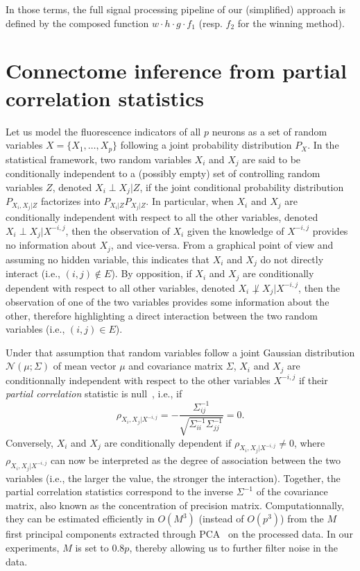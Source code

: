 \documentclass[wcp]{jmlr}
\begin{document}
In those terms, the full signal processing pipeline of our (simplified)
approach is defined by the composed function $w \cdot h \cdot g \cdot f_1$
(resp. $f_2$ for the winning method).


\section{Connectome inference from partial correlation statistics}
\label{sec:inference}

Let us model the fluorescence indicators of all $p$ neurons as a set of random
variables $X = \{X_1, \dots, X_p\}$ following a joint probability distribution
$P_X$. In the statistical framework, two random variables $X_i$ and $X_j$ are
said to be conditionally independent to a (possibly empty) set of controlling
random variables $Z$, denoted $X_i \perp X_j | Z$, if the joint conditional
probability distribution $P_{X_i, X_j | Z}$ factorizes into $P_{X_i|Z}
P_{X_j|Z}$. In particular, when $X_i$ and $X_j$ are conditionally independent
with respect to all the other variables, denoted $X_i \perp X_j | X^{-i,j}$, then the
observation of $X_i$ given the knowledge of $X^{-i,j}$ provides no information
about $X_j$, and vice-versa. From a graphical point of view and assuming no
hidden variable, this indicates that $X_i$ and $X_j$ do not directly interact
(i.e., $(i,j) \notin E$). By opposition, if $X_i$ and $X_j$ are conditionally
dependent with respect to all other variables, denoted $X_i \not\perp X_j |
X^{-i,j}$, then the observation of one of the two variables provides some
information about the other, therefore highlighting a direct interaction
between the two random variables (i.e., $(i, j) \in E$).

Under that assumption that random variables follow a joint Gaussian
distribution $\mathcal{N}(\mu; \Sigma)$ of mean vector $\mu$ and covariance
matrix $\Sigma$, $X_i$ and $X_j$ are conditionnally independent with respect to
the other variables $X^{-i,j}$ if their \textit{partial correlation} statistic
is null~\citep{koller2009probabilistic}, i.e., if
\begin{equation}
\rho_{X_i, X_j | X^{-i,j}} = -\frac{\Sigma^{-1}_{ij}}{\sqrt{\Sigma^{-1}_{ii} \Sigma^{-1}_{jj}}} = 0.
\end{equation}
Conversely, $X_i$ and $X_j$ are conditionally dependent if $\rho_{X_i, X_j | X^{-i,j}} \neq 0$,
where $\rho_{X_i, X_j | X^{-i,j}}$ can now be interpreted as the degree of association
between the two variables (i.e., the larger the value, the stronger the interaction).
Together, the partial correlation statistics correspond to the inverse
$\Sigma^{-1}$ of the covariance matrix, also known as the concentration of
precision matrix. Computationnally, they can be estimated efficiently in
$O(M^3)$ (instead of $O(p^3)$) from the $M$ first principal components
extracted through PCA~\citep{bishop2006pattern} on the processed data. In our experiments, $M$ is set
to $0.8 p$, thereby allowing us to further filter noise in the data.
\end{document}

